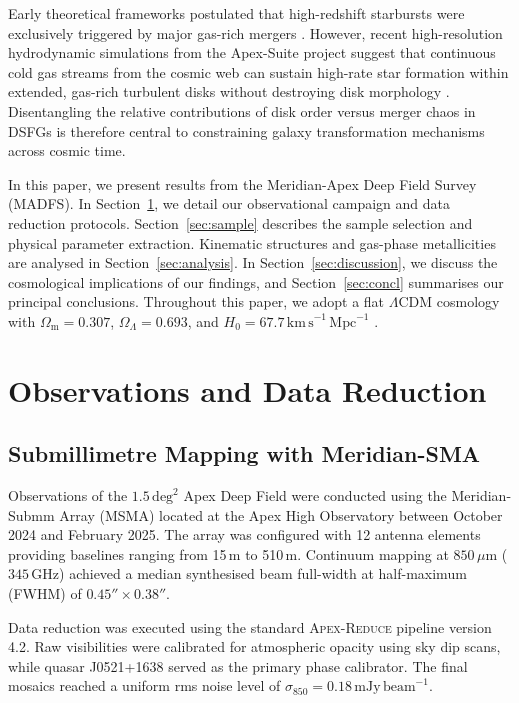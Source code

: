 \documentclass[fleqn,usenatbib]{mnras}
\newcommand{\kms}{\,\mathrm{km\,s}^{-1}}
\begin{document}
Early theoretical frameworks postulated that high-redshift starbursts were exclusively triggered by major gas-rich mergers \citep{Rossi2019}. However, recent high-resolution hydrodynamic simulations from the Apex-Suite project suggest that continuous cold gas streams from the cosmic web can sustain high-rate star formation within extended, gas-rich turbulent disks without destroying disk morphology \citep{Sterling2024}. Disentangling the relative contributions of disk order versus merger chaos in DSFGs is therefore central to constraining galaxy transformation mechanisms across cosmic time.

In this paper, we present results from the Meridian-Apex Deep Field Survey (MADFS). In Section~\ref{sec:obs}, we detail our observational campaign and data reduction protocols. Section~\ref{sec:sample} describes the sample selection and physical parameter extraction. Kinematic structures and gas-phase metallicities are analysed in Section~\ref{sec:analysis}. In Section~\ref{sec:discussion}, we discuss the cosmological implications of our findings, and Section~\ref{sec:concl} summarises our principal conclusions. Throughout this paper, we adopt a flat $\Lambda$CDM cosmology with $\Omega_{\mathrm{m}} = 0.307$, $\Omega_\Lambda = 0.693$, and $H_0 = 67.7\kms\,\mathrm{Mpc}^{-1}$ \citep{Planck2020}.

\section{Observations and Data Reduction}
\label{sec:obs}

\subsection{Submillimetre Mapping with Meridian-SMA}
Observations of the $1.5\,\mathrm{deg}^2$ Apex Deep Field were conducted using the Meridian-Submm Array (MSMA) located at the Apex High Observatory between October 2024 and February 2025. The array was configured with 12 antenna elements providing baselines ranging from 15\,m to 510\,m. Continuum mapping at $850\,\mu\mathrm{m}$ ($345\,\mathrm{GHz}$) achieved a median synthesised beam full-width at half-maximum (FWHM) of $0.45'' \times 0.38''$.

Data reduction was executed using the standard \textsc{Apex-Reduce} pipeline version 4.2. Raw visibilities were calibrated for atmospheric opacity using sky dip scans, while quasar J0521+1638 served as the primary phase calibrator. The final mosaics reached a uniform rms noise level of $\sigma_{850} = 0.18\,\mathrm{mJy\,beam}^{-1}$.
\end{document}
